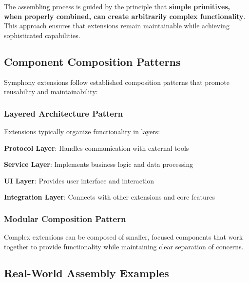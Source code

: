 \begin{infobox}[title=Assembly Philosophy]
The assembling process is guided by the principle that \textbf{simple primitives, when properly combined, can create arbitrarily complex functionality}. This approach ensures that extensions remain maintainable while achieving sophisticated capabilities.
\end{infobox}

\subsection*{Component Composition Patterns}

Symphony extensions follow established composition patterns that promote reusability and maintainability:

\subsubsection*{Layered Architecture Pattern}

Extensions typically organize functionality in layers:

\begin{compactlist}
    \item \textbf{Protocol Layer}: Handles communication with external tools
    \item \textbf{Service Layer}: Implements business logic and data processing
    \item \textbf{UI Layer}: Provides user interface and interaction
    \item \textbf{Integration Layer}: Connects with other extensions and core features
\end{compactlist}

\subsubsection*{Modular Composition Pattern}

Complex extensions can be composed of smaller, focused components that work together to provide functionality while maintaining clear separation of concerns.

\subsection*{Real-World Assembly Examples}

